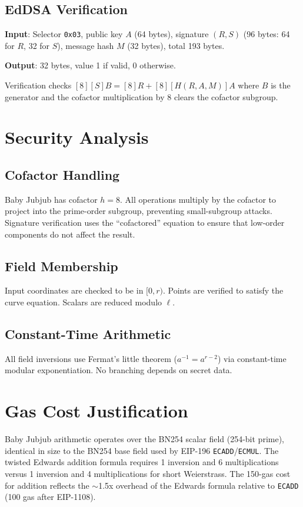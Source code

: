 \documentclass[11pt,a4paper]{article}
\begin{document}
\subsection{EdDSA Verification}

\textbf{Input}: Selector \texttt{0x03}, public key $A$ (64 bytes), signature $(R, S)$
(96 bytes: 64 for $R$, 32 for $S$), message hash $M$ (32 bytes), total 193 bytes.

\textbf{Output}: 32 bytes, value 1 if valid, 0 otherwise.

Verification checks $[8][S]B = [8]R + [8][H(R, A, M)]A$ where $B$ is the generator
and the cofactor multiplication by 8 clears the cofactor subgroup.

\section{Security Analysis}

\subsection{Cofactor Handling}

Baby Jubjub has cofactor $h = 8$. All operations multiply by the cofactor to
project into the prime-order subgroup, preventing small-subgroup attacks.
Signature verification uses the ``cofactored'' equation to ensure that
low-order components do not affect the result.

\subsection{Field Membership}

Input coordinates are checked to be in $[0, r)$. Points are verified to satisfy
the curve equation. Scalars are reduced modulo $\ell$.

\subsection{Constant-Time Arithmetic}

All field inversions use Fermat's little theorem ($a^{-1} = a^{r-2}$) via
constant-time modular exponentiation. No branching depends on secret data.

\section{Gas Cost Justification}

Baby Jubjub arithmetic operates over the BN254 scalar field (254-bit prime),
identical in size to the BN254 base field used by EIP-196 \texttt{ECADD}/\texttt{ECMUL}.
The twisted Edwards addition formula requires 1 inversion and 6 multiplications
versus 1 inversion and 4 multiplications for short Weierstrass. The 150-gas cost
for addition reflects the $\sim$1.5x overhead of the Edwards formula relative to
\texttt{ECADD} (100 gas after EIP-1108).
\end{document}
